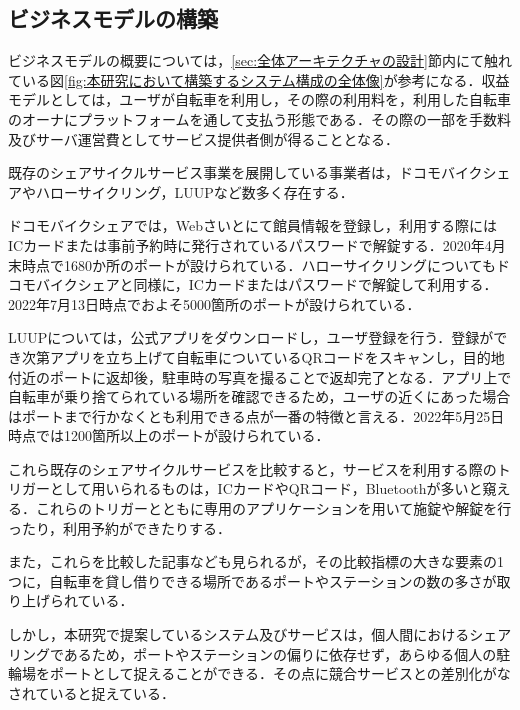   \subsection{ビジネスモデルの構築}
    \label{sec:ビジネスモデルの構築}
      \par ビジネスモデルの概要については，\ref{sec:全体アーキテクチャの設計}節内にて触れている図\ref{fig:本研究において構築するシステム構成の全体像}が参考になる．収益モデルとしては，ユーザが自転車を利用し，その際の利用料を，利用した自転車のオーナにプラットフォームを通して支払う形態である．その際の一部を手数料及びサーバ運営費としてサービス提供者側が得ることとなる．
      \par 既存のシェアサイクルサービス事業を展開している事業者は，ドコモバイクシェアやハローサイクリング，LUUPなど数多く存在する．
      \par ドコモバイクシェアでは，Webさいとにて館員情報を登録し，利用する際にはICカードまたは事前予約時に発行されているパスワードで解錠する．2020年4月末時点で1680か所のポートが設けられている．ハローサイクリングについてもドコモバイクシェアと同様に，ICカードまたはパスワードで解錠して利用する．2022年7月13日時点でおよそ5000箇所のポートが設けられている．
      \par LUUPについては，公式アプリをダウンロードし，ユーザ登録を行う．登録ができ次第アプリを立ち上げて自転車についているQRコードをスキャンし，目的地付近のポートに返却後，駐車時の写真を撮ることで返却完了となる．アプリ上で自転車が乗り捨てられている場所を確認できるため，ユーザの近くにあった場合はポートまで行かなくとも利用できる点が一番の特徴と言える．2022年5月25日時点では1200箇所以上のポートが設けられている．
      \par これら既存のシェアサイクルサービスを比較すると，サービスを利用する際のトリガーとして用いられるものは，ICカードやQRコード，Bluetoothが多いと窺える．これらのトリガーとともに専用のアプリケーションを用いて施錠や解錠を行ったり，利用予約ができたりする．
      \par また，これらを比較した記事なども見られるが，その比較指標の大きな要素の1つに，自転車を貸し借りできる場所であるポートやステーションの数の多さが取り上げられている．
      \par しかし，本研究で提案しているシステム及びサービスは，個人間におけるシェアリングであるため，ポートやステーションの偏りに依存せず，あらゆる個人の駐輪場をポートとして捉えることができる．その点に競合サービスとの差別化がなされていると捉えている．
